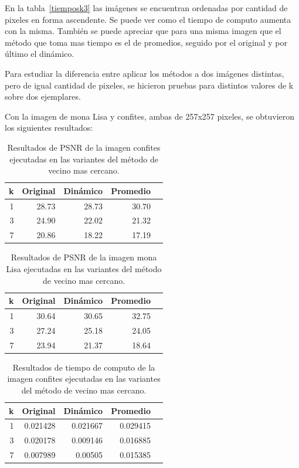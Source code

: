 \documentclass[a4paper]{article}
\newcounter{col}
\begin{document}
En la tabla~\ref{tiemposk3} las imágenes se encuentran ordenadas por cantidad de pixeles en forma ascendente. Se puede ver como el tiempo de computo aumenta con la misma. También se puede apreciar que para una misma imagen que el método que toma mas tiempo es el de promedios, seguido por el original y por \'ultimo el dinámico.

Para estudiar la diferencia entre aplicar los métodos a dos imágenes distintas, pero de igual cantidad de pixeles, se hicieron pruebas para distintos valores de k sobre dos ejemplares. 

Con la imagen de mona Lisa y confites, ambas de 257x257 pixeles, se obtuvieron los siguientes resultados:

\begin{table}[H]
\centering
\begin{tabular}{|r|r|r|r|r|}
\hline
\multicolumn{1}{|c|}{k} & \multicolumn{1}{c|}{Original} & \multicolumn{1}{c|}{Dinámico} & \multicolumn{1}{c|}{Promedio} \\ \hline
1 & 28.73 & 28.73& 30.70 \\ \hline
3 & 24.90 &   22.02 & 21.32 \\ \hline
7 & 20.86 &  18.22 &  17.19 \\ \hline
\end{tabular}
\caption{Resultados de PSNR de la imagen confites ejecutadas en las variantes del m\'etodo de vecino mas cercano.}
\label{}
\end{table}

\begin{table}[H]
\centering
\begin{tabular}{|r|r|r|r|r|}
\hline
\multicolumn{1}{|c|}{k} & \multicolumn{1}{c|}{Original} & \multicolumn{1}{c|}{Dinámico} & \multicolumn{1}{c|}{Promedio} \\ \hline
1 & 30.64 & 30.65& 32.75 \\ \hline
3 & 27.24 &  25.18 & 24.05 \\ \hline
7 & 23.94&  21.37 &  18.64 \\ \hline
\end{tabular}
\caption{Resultados de PSNR de la imagen mona Lisa ejecutadas en las variantes del m\'etodo de vecino mas cercano.}
\label{}
\end{table}

\begin{table}[H]
\centering
\begin{tabular}{|r|r|r|r|r|}
\hline
\multicolumn{1}{|c|}{k} & \multicolumn{1}{c|}{Original} & \multicolumn{1}{c|}{Dinámico} & \multicolumn{1}{c|}{Promedio} \\ \hline
1 & 0.021428 & 0.021667 & 0.029415 \\ \hline
3 & 0.020178 &  0.009146 & 0.016885 \\ \hline
7 & 0.007989 &  0.00505 &  0.015385\\ \hline
\end{tabular}
\caption{Resultados de tiempo de computo de la imagen confites ejecutadas en las variantes del m\'etodo de vecino mas cercano.}
\label{}
\end{table}
\end{document}
